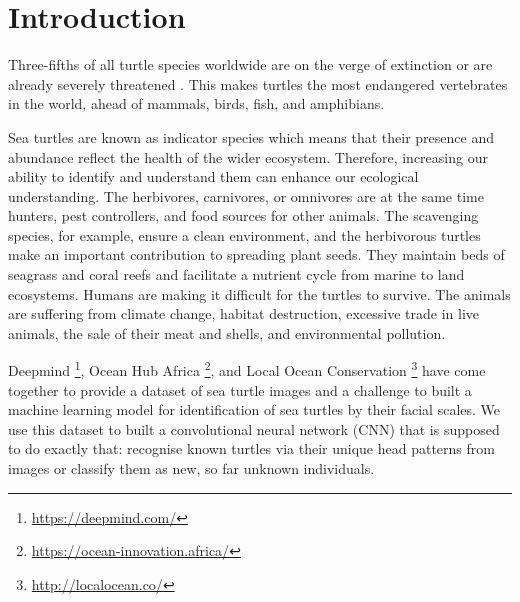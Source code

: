 \section{Introduction}

Three-fifths of all turtle species worldwide are on the verge of extinction or are already severely threatened \citep{Paladino2001, Goldstein2021, Mortimer2008}. This makes turtles the most endangered vertebrates in the world, ahead of mammals, birds, fish, and amphibians.

Sea turtles are known as indicator species which means that their presence and abundance reflect the health of the wider ecosystem. Therefore, increasing our ability to identify and understand them can enhance our ecological understanding. The herbivores, carnivores, or omnivores are at the same time hunters, pest controllers, and food sources for other animals. The scavenging species, for example, ensure a clean environment, and the herbivorous turtles make an important contribution to spreading plant seeds. They maintain beds of seagrass and coral reefs and facilitate a nutrient cycle from marine to land ecosystems. Humans are making it difficult for the turtles to survive. The animals are suffering from climate change, habitat destruction, excessive trade in live animals, the sale of their meat and shells, and environmental pollution.

Deepmind \footnote{\url{https://deepmind.com/}}, Ocean Hub Africa \footnote{\url{https://ocean-innovation.africa/}}, and Local Ocean Conservation \footnote{\url{http://localocean.co/}} have come together to provide a dataset of sea turtle images and a challenge to built a machine learning model for identification of sea turtles by their facial scales. We use this dataset to built a convolutional neural network (CNN) that is supposed to do exactly that: recognise known turtles via their unique head patterns from images or classify them as new, so far unknown individuals.
